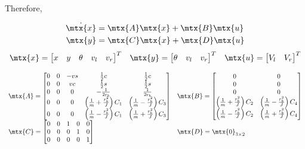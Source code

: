 Therefore,
\begin{theorem}
  \begin{align*}
    \dot{\mtx{x}} &= \mtx{A}\mtx{x} + \mtx{B}\mtx{u} \\
    \mtx{y} &= \mtx{C}\mtx{x} + \mtx{D}\mtx{u}
  \end{align*}
  \begin{equation*}
    \begin{array}{ccc}
      \mtx{x} =
      \begin{bmatrix}
        x & y & \theta & v_l & v_r
      \end{bmatrix}^T &
      \mtx{y} =
      \begin{bmatrix}
        \theta & v_l & v_r
      \end{bmatrix}^T &
      \mtx{u} =
      \begin{bmatrix}
        V_l & V_r
      \end{bmatrix}^T
    \end{array}
  \end{equation*}

  \begin{equation}
    \begin{array}{ll}
      \mtx{A} =
      \begin{bmatrix}
        0 & 0 & -vs & \frac{1}{2}c & \frac{1}{2}c \\
        0 & 0 & vc & \frac{1}{2}s & \frac{1}{2}s \\
        0 & 0 & 0 & -\frac{1}{2r_b} & \frac{1}{2r_b} \\
        0 & 0 & 0 & \left(\frac{1}{m} + \frac{r_b^2}{J}\right) C_1 &
          \left(\frac{1}{m} - \frac{r_b^2}{J}\right) C_3 \\
        0 & 0 & 0 & \left(\frac{1}{m} - \frac{r_b^2}{J}\right) C_1 &
          \left(\frac{1}{m} + \frac{r_b^2}{J}\right) C_3
      \end{bmatrix} &
      \mtx{B} =
      \begin{bmatrix}
        0 & 0 \\
        0 & 0 \\
        0 & 0 \\
        \left(\frac{1}{m} + \frac{r_b^2}{J}\right) C_2 &
        \left(\frac{1}{m} - \frac{r_b^2}{J}\right) C_4 \\
        \left(\frac{1}{m} - \frac{r_b^2}{J}\right) C_2 &
        \left(\frac{1}{m} + \frac{r_b^2}{J}\right) C_4
      \end{bmatrix} \\
      \mtx{C} =
      \begin{bmatrix}
        0 & 0 & 1 & 0 & 0 \\
        0 & 0 & 0 & 1 & 0 \\
        0 & 0 & 0 & 0 & 1
      \end{bmatrix} &
      \mtx{D} = \mtx{0}_{3 \times 2}
    \end{array}
  \end{equation}


\end{theorem}

